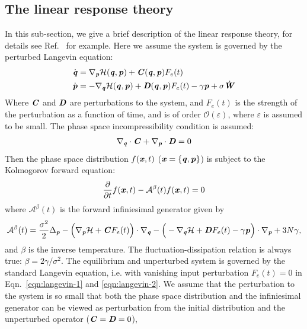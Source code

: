 \documentclass[aip,jcp,a4paper,reprint,onecolumn]{revtex4-1}
\newcommand{\vect}[1]{\textbf{\textit{#1}}}
\newcommand{\mh}{\mathcal H}
\newcommand{\mo}{\mathcal O}
\newcommand{\fwg}{{\mathcal A}}
\begin{document}
\subsection{The linear response theory}
In this sub-section, we give a brief description of the linear response
theory, for details see Ref.~\cite{tuckeman2010statistical} for
example. Here we assume the system is governed by the
perturbed Langevin equation:
\begin{align}\label{eqn:langevin-1}
  \dot{\vect q} & = \nabla_{\vect p}\mh(\vect q,\vect p)
  + \vect C(\vect q,\vect p) F_e(t)\\\label{eqn:langevin-2}
  \dot{\vect p} & =- \nabla_{\vect q}\mh(\vect q,\vect p)
  + \vect D(\vect q,\vect p) F_e(t)
  - \gamma\vect p
  + \sigma\dot{\vect W}
\end{align}
Where $\vect C$ and $\vect D$ are perturbations to the system, and
$F_e(t)$ is the strength of the perturbation as a function of time,
and is of order $\mo (\varepsilon)$, where $\varepsilon$ is assumed to be small.
The phase space incompressibility condition is assumed:
\begin{align}
  \nabla_{\vect q}\cdot\vect C + \nabla_{\vect p}\cdot\vect D = 0
\end{align}
Then the phase space distribution $f(\vect x, t)$ ($\vect x = \{\vect
q, \vect p\}$) is subject to the Kolmogorov forward equation:
\begin{align}\label{eqn:orig-forward}
  \frac{\partial}{\partial t} f(\vect x, t) - \fwg^\beta(t) f(\vect x, t) = 0
\end{align}
where $\fwg^\beta(t)$ is the forward infiniesimal generator given by
\begin{align}
  \fwg^\beta(t) =
  \frac{\sigma^2}2\Delta_{\vect p}
  - \Big(
  \nabla_{\vect p}\mh + \vect C F_e(t)
  \Big)\cdot\nabla_{\vect q}
  - \Big(
  -\nabla_{\vect q}\mh +
  \vect D F_e(t) - \gamma\vect p
  \Big)\cdot\nabla_{\vect p}
  + 3N\gamma,
\end{align}
and $\beta$ is the inverse temperature.
The fluctuation-dissipation relation is always true:
$\beta = 2\gamma / \sigma^2$.
The equilibrium and unperturbed system
is governed by
the standard Langevin equation, i.e. with
vanishing input perturbation $F_e(t) = 0$ in
Eqn.~\eqref{eqn:langevin-1} and \eqref{eqn:langevin-2}.
We assume that the perturbation to the
system is so small that both the phase space distribution and the
infiniesimal generator can be viewed as perturbation from the initial
distribution and the unperturbed operator
($\vect C = \vect D = 0$),
\end{document}
